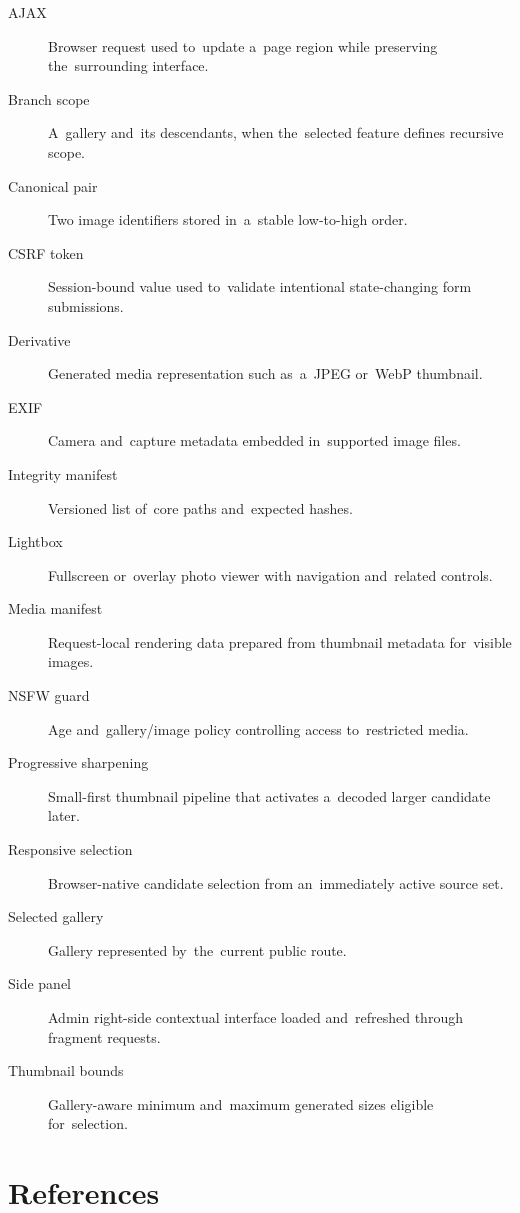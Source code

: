 \documentclass[11pt,a4paper]{article}
\begin{document}
\begin{description}
  \item[AJAX] Browser request used to~update a~page region while preserving
  the~surrounding interface.
  \item[Branch scope] A~gallery and~its descendants, when the~selected feature
  defines recursive scope.
  \item[Canonical pair] Two image identifiers stored in~a~stable low-to-high
  order.
  \item[CSRF token] Session-bound value used to~validate intentional
  state-changing form submissions.
  \item[Derivative] Generated media representation such as~a~JPEG or~WebP
  thumbnail.
  \item[EXIF] Camera and~capture metadata embedded in~supported image files.
  \item[Integrity manifest] Versioned list of~core paths and~expected hashes.
  \item[Lightbox] Fullscreen or~overlay photo viewer with navigation and~related
  controls.
  \item[Media manifest] Request-local rendering data prepared from thumbnail
  metadata for~visible images.
  \item[NSFW guard] Age and~gallery/image policy controlling access
  to~restricted media.
  \item[Progressive sharpening] Small-first thumbnail pipeline that activates
  a~decoded larger candidate later.
  \item[Responsive selection] Browser-native candidate selection from
  an~immediately active source set.
  \item[Selected gallery] Gallery represented by~the~current public route.
  \item[Side panel] Admin right-side contextual interface loaded and~refreshed
  through fragment requests.
  \item[Thumbnail bounds] Gallery-aware minimum and~maximum generated sizes
  eligible for~selection.
\end{description}

\clearpage
\section{References}
\label{sec:references}
\end{document}
